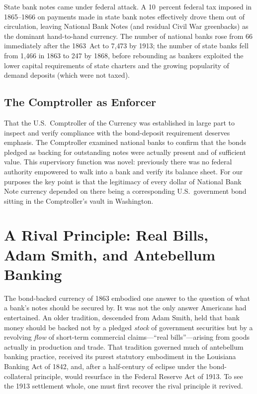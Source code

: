 \documentclass[12pt]{article}
\begin{document}
State bank notes came under federal attack.  A 10~percent federal tax
imposed in 1865--1866 on payments made in state bank notes effectively drove them
out of circulation, leaving National Bank Notes (and residual Civil War
greenbacks) as the dominant hand-to-hand currency.  The number of national banks
rose from 66 immediately after the 1863~Act to 7{,}473 by 1913; the number of state
banks fell from 1{,}466 in 1863 to 247 by 1868, before rebounding as bankers
exploited the lower capital requirements of state charters and the growing
popularity of demand deposits (which were not taxed).

\subsection{The Comptroller as Enforcer}

That the U.S.\ Comptroller of the Currency was established in large part to inspect
and verify compliance with the bond-deposit requirement deserves emphasis.  The
Comptroller examined national banks to confirm that the bonds pledged as backing for
outstanding notes were actually present and of sufficient value.  This supervisory
function was novel: previously there was no federal authority empowered to walk
into a bank and verify its balance sheet.  For our purposes the key point is that
the legitimacy of every dollar of National Bank Note currency depended on
there being a corresponding U.S.\ government bond sitting in the Comptroller's
vault in Washington.

\section{A Rival Principle: Real Bills, Adam Smith, and Antebellum Banking}
\label{sec:antebellum-real-bills}

The bond-backed currency of 1863 embodied one answer to the question of what a
bank's notes should be secured by.  It was not the only answer Americans had
entertained.  An older tradition, descended from Adam Smith, held that bank money
should be backed not by a pledged \emph{stock} of government securities but by a
revolving \emph{flow} of short-term commercial claims---``real bills''---arising
from goods actually in production and trade.  That tradition governed much of
antebellum banking practice, received its purest statutory embodiment in the
Louisiana Banking Act of 1842, and, after a half-century of eclipse under the
bond-collateral principle, would resurface in the Federal Reserve Act of 1913.
To see the 1913 settlement whole, one must first recover the rival principle it
revived.
\end{document}
